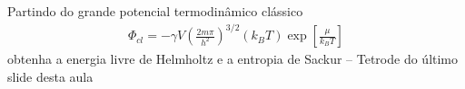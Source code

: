\begin{prob}
  Partindo do grande potencial termodinâmico clássico
  \begin{align}
    \Phi_{cl}=-\gamma V\left(\frac{2m\pi}{h^2}\right)^{3/2}\left(k_BT\right)\exp\left[\frac{\mu}{k_BT}\right]
  \end{align}
  obtenha a energia livre de Helmholtz e a entropia de Sackur – Tetrode do último slide desta aula
\end{prob}
